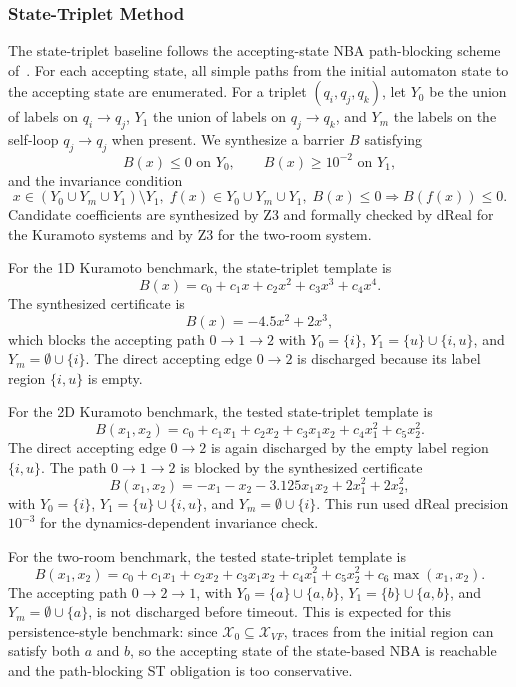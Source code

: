 \subsubsection{State-Triplet Method}
The state-triplet baseline follows the accepting-state NBA path-blocking scheme of~\cite{wongpiromsarn2015automata}. For each accepting state, all simple paths from the initial automaton state to the accepting state are enumerated. For a triplet $(q_i,q_j,q_k)$, let $Y_0$ be the union of labels on $q_i\rightarrow q_j$, $Y_1$ the union of labels on $q_j\rightarrow q_k$, and $Y_m$ the labels on the self-loop $q_j\rightarrow q_j$ when present. We synthesize a barrier $B$ satisfying
\[
B(x)\le 0 \text{ on } Y_0,\qquad
B(x)\ge 10^{-2} \text{ on } Y_1,
\]
and the invariance condition
\[
x\in (Y_0\cup Y_m\cup Y_1)\setminus Y_1,\; f(x)\in Y_0\cup Y_m\cup Y_1,\; B(x)\le 0
\Rightarrow B(f(x))\le 0.
\]
Candidate coefficients are synthesized by Z3 and formally checked by dReal for the Kuramoto systems and by Z3 for the two-room system.

For the 1D Kuramoto benchmark, the state-triplet template is
\[
B(x)=c_0+c_1x+c_2x^2+c_3x^3+c_4x^4.
\]
The synthesized certificate is
\[
B(x)=-4.5x^2+2x^3,
\]
which blocks the accepting path $0\rightarrow1\rightarrow2$ with $Y_0=\{i\}$, $Y_1=\{u\}\cup\{i,u\}$, and $Y_m=\emptyset\cup\{i\}$. The direct accepting edge $0\rightarrow2$ is discharged because its label region $\{i,u\}$ is empty.

For the 2D Kuramoto benchmark, the tested state-triplet template is
\[
B(x_1,x_2)=c_0+c_1x_1+c_2x_2+c_3x_1x_2+c_4x_1^2+c_5x_2^2.
\]
The direct accepting edge $0\rightarrow2$ is again discharged by the empty label region $\{i,u\}$. The path $0\rightarrow1\rightarrow2$ is blocked by the synthesized certificate
\[
B(x_1,x_2)=-x_1-x_2-3.125x_1x_2+2x_1^2+2x_2^2,
\]
with $Y_0=\{i\}$, $Y_1=\{u\}\cup\{i,u\}$, and $Y_m=\emptyset\cup\{i\}$. This run used dReal precision $10^{-3}$ for the dynamics-dependent invariance check.

For the two-room benchmark, the tested state-triplet template is
\[
B(x_1,x_2)=c_0+c_1x_1+c_2x_2+c_3x_1x_2+c_4x_1^2+c_5x_2^2+c_6\max(x_1,x_2).
\]
The accepting path $0\rightarrow2\rightarrow1$, with $Y_0=\{a\}\cup\{a,b\}$, $Y_1=\{b\}\cup\{a,b\}$, and $Y_m=\emptyset\cup\{a\}$, is not discharged before timeout. This is expected for this persistence-style benchmark: since $\mathcal{X}_0\subseteq \mathcal{X}_{VF}$, traces from the initial region can satisfy both $a$ and $b$, so the accepting state of the state-based NBA is reachable and the path-blocking ST obligation is too conservative.

